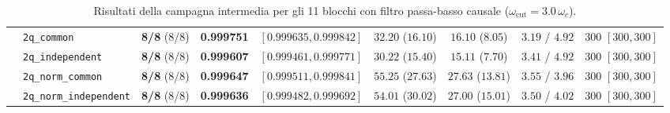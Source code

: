 \documentclass[11pt,a4paper]{article}
\begin{document}
\begin{table}[H]
{\begin{tabular}{llccccccc}
 & \texttt{2q\_common} & \textbf{8/8} (8/8) & \textbf{0.999751} & $[0.999635, 0.999842]$ & $32.20$ ($16.10$) & $16.10$ ($8.05$) & $3.19$ / $4.92$ & $300$ $[300, 300]$ \\
 & \texttt{2q\_independent} & \textbf{8/8} (8/8) & \textbf{0.999607} & $[0.999461, 0.999771]$ & $30.22$ ($15.40$) & $15.11$ ($7.70$) & $3.41$ / $4.92$ & $300$ $[300, 300]$ \\
 & \texttt{2q\_norm\_common} & \textbf{8/8} (8/8) & \textbf{0.999647} & $[0.999511, 0.999841]$ & $55.25$ ($27.63$) & $27.63$ ($13.81$) & $3.55$ / $3.96$ & $300$ $[300, 300]$ \\
 & \texttt{2q\_norm\_independent} & \textbf{8/8} (8/8) & \textbf{0.999636} & $[0.999482, 0.999692]$ & $54.01$ ($30.02$) & $27.00$ ($15.01$) & $3.50$ / $4.02$ & $300$ $[300, 300]$ \\
\bottomrule
\end{tabular}%
}
\caption{Risultati della campagna intermedia per gli 11 blocchi con filtro passa-basso causale ($\omega_{\text{cut}} = 3.0\,\omega_c$).}
\label{tab:intermedia_filtrata}
\end{table}
\end{document}
